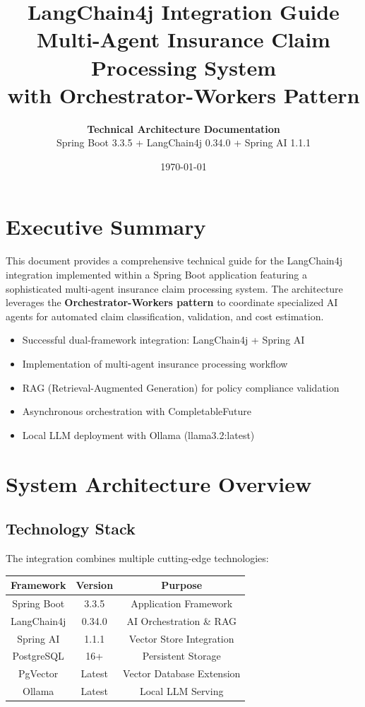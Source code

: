 \documentclass[12pt,a4paper]{article}
\title{
    \Huge\textbf{LangChain4j Integration Guide} \\
    \Large Multi-Agent Insurance Claim Processing System \\
    \large with Orchestrator-Workers Pattern
}
\author{
    \textbf{Technical Architecture Documentation} \\
    Spring Boot 3.3.5 + LangChain4j 0.34.0 + Spring AI 1.1.1
}
\date{\today}
\begin{document}
\maketitle
\tableofcontents
\newpage

\section{Executive Summary}

This document provides a comprehensive technical guide for the LangChain4j integration implemented within a Spring Boot application featuring a sophisticated multi-agent insurance claim processing system. The architecture leverages the \textbf{Orchestrator-Workers pattern} to coordinate specialized AI agents for automated claim classification, validation, and cost estimation.

\begin{tcolorbox}[colback=blue!5!white,colframe=blue!75!black,title=Key Achievements]
\begin{itemize}
    \item Successful dual-framework integration: LangChain4j + Spring AI
    \item Implementation of multi-agent insurance processing workflow
    \item RAG (Retrieval-Augmented Generation) for policy compliance validation
    \item Asynchronous orchestration with CompletableFuture
    \item Local LLM deployment with Ollama (llama3.2:latest)
\end{itemize}
\end{tcolorbox}

\section{System Architecture Overview}

\subsection{Technology Stack}

The integration combines multiple cutting-edge technologies:

\begin{center}
\begin{tabular}{|c|c|c|}
\hline
\textbf{Framework} & \textbf{Version} & \textbf{Purpose} \\
\hline
Spring Boot & 3.3.5 & Application Framework \\
LangChain4j & 0.34.0 & AI Orchestration \& RAG \\
Spring AI & 1.1.1 & Vector Store Integration \\
PostgreSQL & 16+ & Persistent Storage \\
PgVector & Latest & Vector Database Extension \\
Ollama & Latest & Local LLM Serving \\
\hline
\end{tabular}
\end{center}
\end{document}
